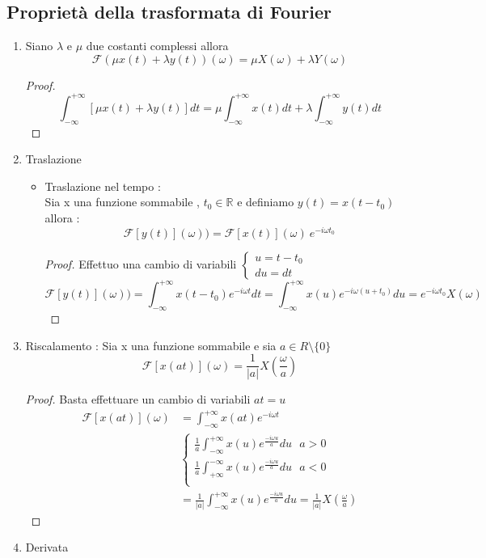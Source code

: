 \documentclass{article}
\theoremstyle{definition}
\newcommand{\R}{\mathbb{R}}
\newcommand{\la}{\lambda}
\newcommand{\intinf}{\int_{-\infty}^{+\infty}}
\newcommand{\f}{\mathscr{F}}
\begin{document}
\subsection{Proprietà della trasformata di Fourier}
\begin{enumerate}
	\item Siano $\la$ e $\mu$ due costanti complessi allora 
	$$\f(\mu x(t)+\la y(t))(\omega)=\mu X(\omega)+\la Y(\omega)$$
	\begin{proof}
$$\intinf \left[\mu x(t)+\la y(t)\right]dt=\mu \intinf x(t)dt + \la \intinf y(t)dt$$
	\end{proof}
	\item Traslazione 
	\begin{itemize}
\item Traslazione nel tempo : \\
Sia x una funzione sommabile , $t_0 \in \R$ e definiamo $y(t)=x(t-t_0)$ allora : 
$$\f\left[y(t)\right](\omega))=\f\left[x(t)\right](\omega)\ e^{-i\omega t_0}$$
\begin{proof}
	Effettuo una cambio di variabili $\begin{cases}
	u=t-t_0\\
	du=dt
	\end{cases}$
	$$\f\left[y(t)\right](\omega))=\intinf x(t-t_0)e^{-i\omega t}dt=\intinf x(u)e^{-i\omega (u+t_0)}du=e^{-i\omega t_0} X(\omega)$$
\end{proof}
	\end{itemize}
	\item Riscalamento :
	Sia x una funzione sommabile e sia $ a \in R \setminus \{0\}$
	$$\f\left[x(at)\right](\omega)=\frac{1}{|a|}X(\frac{\omega}{a})$$
	\begin{proof}
	Basta effettuare un cambio di variabili $at=u$
	\begin{align*}
		\f\left[x(at)\right](\omega)&=\intinf x(at)e^{-i\omega t}\\
		&\begin{cases}
			\frac{1}{a}\intinf x(u)e^{ \frac{-i\omega u}{a}} du \ \ \ a > 0\\
				\frac{1}{a}\int_{+\infty}^{-\infty} x(u)e^{ \frac{-i\omega u}{a}} du \ \ \ a <0\\
				\end{cases}\\
		&= 		\frac{1}{|a|}\intinf x(u)e^{ \frac{-i\omega u}{a}} du = \frac{1}{|a|} X(\frac{\omega}{a})
	\end{align*}
	\end{proof}
	\item Derivata 

\end{enumerate}
\end{document}
